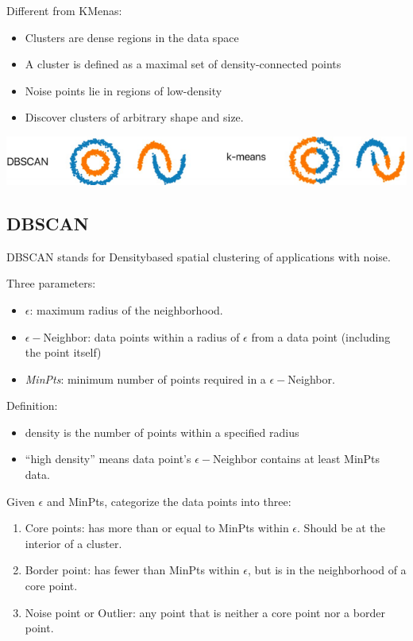 \documentclass[letterpaper,12pt]{article}
\begin{document}
Different from K\-Menas:
\begin{itemize}
    \item Clusters are dense regions in the data space
    \item A cluster is defined as a maximal set of density-connected points 
    \item Noise points lie in regions of low-density
    \item Discover clusters of arbitrary shape and size.
\end{itemize}

\includegraphics[scale=0.8]{Image/DBSCAN V.S. K-Means.png}

\subsection{DBSCAN}
DBSCAN stands for Density\-based spatial clustering of applications with noise. 

Three parameters:
\begin{itemize}
    \item $\epsilon$: maximum radius of the neighborhood.
    \item $\epsilon-$Neighbor: data points within a radius of $\epsilon$ from a data point (including the point itself)
    \item \textit{MinPts}: minimum number of points required in a $\epsilon-$Neighbor.
\end{itemize}

Definition:
\begin{itemize}
    \item density is the number of points within a specified radius
    \item ``high density'' means data point's $\epsilon-$Neighbor contains at least MinPts data. 
\end{itemize}

Given $\epsilon$ and MinPts, categorize the data points into three:
\begin{enumerate}
    \item Core points: has more than or equal to MinPts within $\epsilon$. Should be at the interior of a cluster.
    \item Border point: has fewer than MinPts within $\epsilon$, but is in the neighborhood of a core point.
    \item Noise point or Outlier: any point that is neither a core point nor a border point. 
\end{enumerate}
\end{document}
